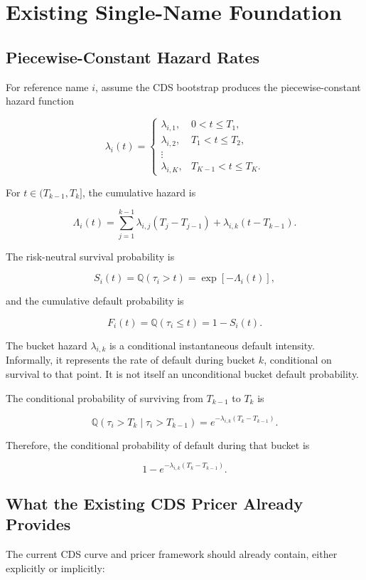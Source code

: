 \documentclass[11pt,a4paper]{article}
\newcommand{\Q}{\mathbb{Q}}
\begin{document}
\section{Existing Single-Name Foundation}

\subsection{Piecewise-Constant Hazard Rates}

For reference name $i$, assume the CDS bootstrap produces the piecewise-constant hazard function

\[
\lambda_i(t)=
\begin{cases}
\lambda_{i,1}, & 0<t\leq T_1,\\
\lambda_{i,2}, & T_1<t\leq T_2,\\
\vdots & \\
\lambda_{i,K}, & T_{K-1}<t\leq T_K.
\end{cases}
\]

For $t\in(T_{k-1},T_k]$, the cumulative hazard is

\[
\Lambda_i(t)
=
\sum_{j=1}^{k-1}
\lambda_{i,j}(T_j-T_{j-1})
+
\lambda_{i,k}(t-T_{k-1}).
\]

The risk-neutral survival probability is

\[
S_i(t)
=
\Q(\tau_i>t)
=
\exp[-\Lambda_i(t)],
\]

and the cumulative default probability is

\[
F_i(t)
=
\Q(\tau_i\leq t)
=
1-S_i(t).
\]

The bucket hazard $\lambda_{i,k}$ is a conditional instantaneous default intensity. Informally, it represents the rate of default during bucket $k$, conditional on survival to that point. It is not itself an unconditional bucket default probability.

The conditional probability of surviving from $T_{k-1}$ to $T_k$ is

\[
\Q(\tau_i>T_k\mid \tau_i>T_{k-1})
=
e^{-\lambda_{i,k}(T_k-T_{k-1})}.
\]

Therefore, the conditional probability of default during that bucket is

\[
1-e^{-\lambda_{i,k}(T_k-T_{k-1})}.
\]

\subsection{What the Existing CDS Pricer Already Provides}

The current CDS curve and pricer framework should already contain, either explicitly or implicitly:
\end{document}
